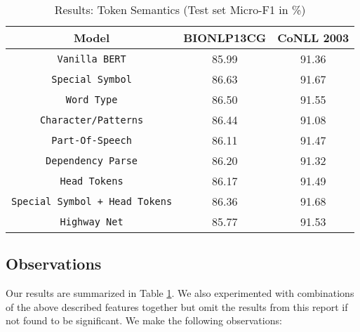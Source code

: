 \begin{table}[h!]
\centering
\begin{tabular}{|c|c|c|}\hline
	\textbf{Model} & \textbf{BIONLP13CG} & \textbf{CoNLL 2003}\\\hline
	\texttt{Vanilla BERT} & 85.99 & 91.36\\\hline
	\texttt{Special Symbol} & 86.63 & 91.67\\\hline
	\texttt{Word Type} & 86.50 & 91.55\\\hline
	\texttt{Character/Patterns} & 86.44 & 91.08\\\hline
	\texttt{Part-Of-Speech} & 86.11 & 91.47\\\hline
	\texttt{Dependency Parse} & 86.20 & 91.32\\\hline
	\texttt{Head Tokens} & 86.17 & 91.49\\\hline
	\texttt{Special Symbol + Head Tokens} & 86.36 & 91.68\\\hline
	\texttt{Highway Net} & 85.77 & 91.53\\\hline
	\end{tabular}
    \caption{Results: Token Semantics (Test set Micro-F1 in \%)}
    \label{tab:res_token_semantics}
\end{table}

\subsection{Observations}
Our results are summarized in Table \ref{tab:res_token_semantics}. We also experimented with combinations of the above described features together but omit the results from this report if not found to be significant. We make the following observations:

